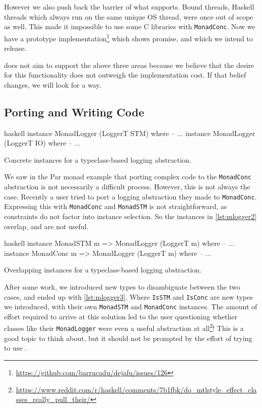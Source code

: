 However we also push back the barrier of what \dejafu{} supports.
Bound threads, Haskell threads which always run on the same unique OS
thread, were once out of scope as well.  This made it impossible to
use some C libraries with \verb|MonadConc|.  Now we have a prototype
implementation\footnote{\url{https://github.com/barrucadu/dejafu/issues/126}}
which shows promise, and which we intend to release.

\dejafu{} does not aim to support the above three areas because we
believe that the desire for this functionality does not outweigh the
implementation cost.  If that belief changes, we will look for a way.

\subsection{Porting and Writing Code}

\begin{listing}
\centering
\begin{cminted}{haskell}
instance MonadLogger (LoggerT STM) where -- ...
instance MonadLogger (LoggerT IO) where -- ...
\end{cminted}
\caption{Concrete instances for a typeclass-based logging abstraction.}\label{lst:mlogger1}
\end{listing}

We saw in the Par monad example that porting complex code to the
\verb|MonadConc| abstraction is not necessarily a difficult process.
However, this is not always the case.  Recently a user tried to port a
logging abstraction they made to \verb|MonadConc|.  Expressing this
with \verb|MonadConc| and \verb|MonadSTM| is not straightforward, as
constraints do not factor into instance selection.  So the instances
in \cref{lst:mlogger2} overlap, and are not useful.

\begin{listing}
\centering
\begin{cminted}{haskell}
instance MonadSTM  m => MonadLogger (LoggerT m) where -- ...
instance MonadConc m => MonadLogger (LoggerT m) where -- ...
\end{cminted}
\caption{Overlapping instances for a typeclass-based logging abstraction.}\label{lst:mlogger2}
\end{listing}

After some work, we introduced new types to disambiguate between the
two cases, and ended up with \cref{lst:mlogger3}.  Where \verb|IsSTM|
and \verb|IsConc| are new types we introduced, with their own
\verb|MonadSTM| and \verb|MonadConc| instances.  The amount of effort
required to arrive at this solution led to the user questioning
whether classes like their \verb|MonadLogger| were even a useful
abstraction at
all\footnote{\url{https://www.reddit.com/r/haskell/comments/7b1fbk/do_mtlstyle_effect_classes_really_pull_their/}}!
This is a good topic to think about, but it should not be prompted by
the effort of trying to use \dejafu{}.

